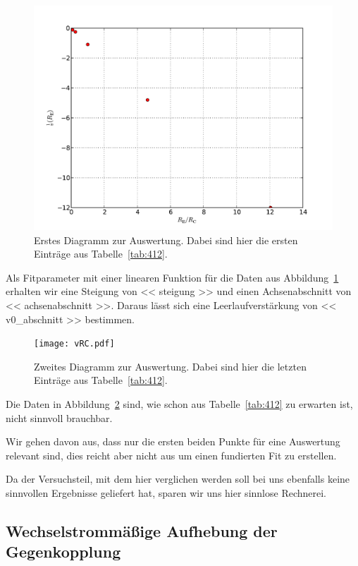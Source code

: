 \begin{figure}[htbp]
    \centering
    \includegraphics[width=\textwidth]{vRE.pdf}
    \caption{%
        Erstes Diagramm zur Auswertung. Dabei sind hier die ersten Einträge
        aus Tabelle~\ref{tab:412}.
    }
    \label{fig:vRE}
\end{figure}

Als Fitparameter mit einer linearen Funktion für die Daten aus
Abbildung~\ref{fig:vRE} erhalten wir eine Steigung von \num{<< steigung >>} und
einen Achsenabschnitt von \num{<< achsenabschnitt >>}. Daraus lässt sich eine
Leerlaufverstärkung von \num{<< v0_abschnitt >>} bestimmen.

\begin{figure}[htbp]
    \centering
    \texttt{[image: vRC.pdf]}
    \caption{%
        Zweites Diagramm zur Auswertung. Dabei sind hier die letzten Einträge
        aus Tabelle~\ref{tab:412}.
    }
    \label{fig:vRC}
\end{figure}

Die Daten in Abbildung~\ref{fig:vRC} sind, wie schon aus Tabelle~\ref{tab:412}
zu erwarten ist, nicht sinnvoll brauchbar.

Wir gehen davon aus, dass nur die ersten beiden Punkte für eine Auswertung
relevant sind, dies reicht aber nicht aus um einen fundierten Fit zu erstellen.

Da der Versuchsteil, mit dem hier verglichen werden soll bei uns ebenfalls
keine sinnvollen Ergebnisse geliefert hat, sparen wir uns hier sinnlose
Rechnerei.

\FloatBarrier
\subsection{Wechselstrommäßige Aufhebung der Gegenkopplung}

